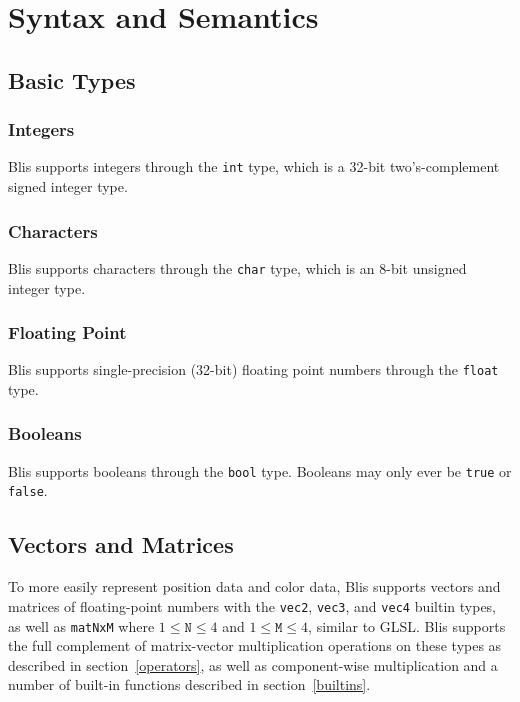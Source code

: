 \documentclass[11pt]{article}
\newcommand{\code}[1]{\texttt{#1}}
\begin{document}
\section{Syntax and Semantics}

\subsection{Basic Types}

\subsubsection{Integers}

Blis supports integers through the \code{int} type, which is a 32-bit two's-complement signed integer type.

\subsubsection{Characters}

Blis supports characters through the \code{char} type, which is an 8-bit unsigned integer type.

\subsubsection{Floating Point}

Blis supports single-precision (32-bit) floating point numbers through the \code{float} type.

\subsubsection{Booleans}

Blis supports booleans through the \code{bool} type. Booleans may only ever be \code{true} or \code{false}.

\subsection{Vectors and Matrices}

To more easily represent position data and color data, Blis supports vectors and matrices of floating-point numbers with the \code{vec2}, \code{vec3}, and \code{vec4} builtin types, as well as \code{matNxM} where  $1 \leq \code{N} \leq 4$ and $1 \leq \code{M} \leq 4$, similar to GLSL. Blis supports the full complement of matrix-vector multiplication operations on these types as described in section~\ref{operators}, as well as component-wise multiplication and a number of built-in functions described in section~\ref{builtins}.
\end{document}
